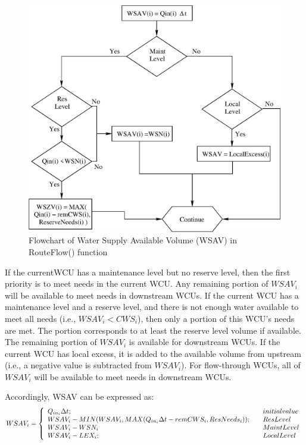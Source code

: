 \begin{figure}
 \begin{center}
  \includegraphics[scale=.33]{Graphics/flowchartWSAV.eps}
 \end{center}
 \caption{\label{fig:flowchartWSAV} Flowchart of Water Supply Available Volume (WSAV) in RouteFlow() function}
\end{figure}

If the currentWCU has a maintenance level but no reserve level, then
the first priority is to meet needs in the current WCU. Any remaining
portion of $WSAV_i$ will be available to meet needs in downstream
WCUs. If the current WCU has a maintenance level and a reserve level,
and there is not enough water available to meet all needs (i.e.,
$WSAV_i < CWS_i$), then only a portion of this WCU's needs are
met. The portion corresponds to at least the reserve level volume if
available. The remaining portion of $WSAV_i$ is available for
downstream WCUs. If the current WCU has local excess, it is added to
the available volume from upstream (i.e., a negative value is
subtracted from $WSAV_i$). For flow-through WCUs, all of $WSAV_i$ will
be available to meet needs in downstream WCUs.

Accordingly, WSAV can be expressed as: 
\begin{align}
 WSAV_i = \left\{
  \begin{array}{l l}
    Q_{in_i} \Delta t; & \quad initialvalue \\
    WSAV_i - MIN(WSAV_i, MAX(Q_{in_i}\Delta t - remCWS_i, ResNeeds_i)); & \quad ResLevel \\
    WSAV_i - WSN_i &\quad MaintLevel \\
    WSAV_i - LEX_i; & \quad LocalLevel \\
  \end{array} \right.
\end{align}


